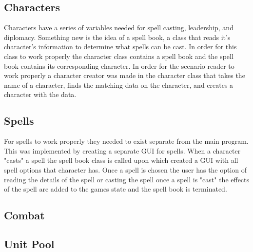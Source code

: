\documentclass[12pt,a4paper]{article}
\begin{document}
\subsection{Characters}
Characters have a series of variables needed for spell casting, leadership, and 
diplomacy. Something new is the idea of a spell book, a class that reads it's 
character's information to determine what spells can be cast. In order for this
class to work properly the character class contains a spell book and the spell
book contains its corresponding character. In order for the scenario reader to 
work properly a character creator was made in the character class that takes the
name of a character, finds the matching data on the character, and creates a 
character with the data.

\subsection{Spells}
For spells to work properly they needed to exist separate from the main program.
This was implemented by creating a separate GUI for spells. When a character 
"casts" a spell the spell book class is called upon which created a GUI with 
all spell options that character has. Once a spell is chosen the user has the 
option of reading the details of the spell or casting the spell once a spell is 
"cast" the effects of the spell are added to the games state and the spell book 
is terminated.

\subsection{Combat}

\subsection{Unit Pool}
\end{document}
